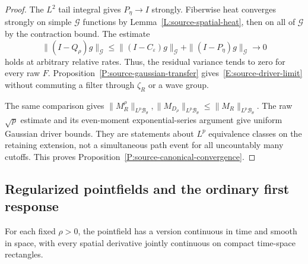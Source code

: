\begin{proof}
  The $L^2$ tail integral gives $P_\eta\to I$ strongly. Fiberwise heat
  converges strongly on simple $\mathcal G$ functions by
  Lemma~\ref{L:source-spatial-heat}, then on all of $\mathcal G$ by the
  contraction bound. The estimate
  \[
    \|(I-Q_\rho)g\|_{\mathcal G}
    \le\|(I-C_\varepsilon)g\|_{\mathcal G}
    +\|(I-P_\eta)g\|_{\mathcal G}\longrightarrow0
  \]
  holds at arbitrary relative rates. Thus, the residual variance tends
  to zero for every raw $F$. Proposition~\ref{P:source-gaussian-transfer}
  gives~\eqref{E:source-driver-limit} without commuting a filter through
  $\zeta_R$ or a wave group.

  The same comparison gives
  $\|M_R^\rho\|_{L^p\mathscr B_\theta},
  \|M_{D_\rho}\|_{L^p\mathscr B_\theta}
  \le\|M_R\|_{L^p\mathscr B_\theta}$. The raw $\sqrt p$ estimate and
  its even-moment exponential-series argument give uniform Gaussian
  driver bounds. They are statements about $L^p$ equivalence classes
  on the retaining extension, not a simultaneous path event for all
  uncountably many cutoffs.
  This proves Proposition~\ref{P:source-canonical-convergence}.
\end{proof}

\subsection{Regularized pointfields and the ordinary first response}

\begin{lemma}\label{L:source-pointfield-regularity}
  For each fixed $\rho>0$, the pointfield has a version continuous in
  time and smooth in space, with every spatial derivative jointly
  continuous on compact time-space rectangles.
\end{lemma}

